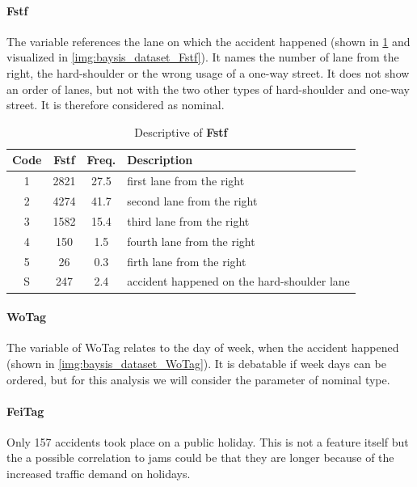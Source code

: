 \paragraph{Fstf}
\label{baysis_dataset_Fstf}
The variable references the lane on which the accident happened (shown in \cref{tbl:baysis_dataset_Fstf} and visualized in \cref{img:baysis_dataset_Fstf}). It names the number of lane from the right, the hard-shoulder or the wrong usage of a one-way street. It does not show an order of lanes, but not with the two other types of hard-shoulder and one-way street. It is therefore considered as nominal.
\begin{table}[ht]
	\centering
	\small
	\begin{tabular}{c|c|c|l}
		\toprule
		Code & \textbf{Fstf} & Freq. & Description \\ 
		\midrule  
		1 & 2821 	& 27.5 	& first lane from the right \\
		2 & 4274 	& 41.7 	& second lane from the right \\
		3 & 1582 	& 15.4 	& third lane from the right \\
		4 & 150 	& 1.5 	& fourth lane from the right \\
		5 & 26 		& 0.3 	& firth lane from the right \\ 
 		S & 247 	& 2.4 	& accident happened on the hard-shoulder lane \\ 
		\bottomrule
	\end{tabular}
	\caption{Descriptive of \textbf{Fstf}}
	\label{tbl:baysis_dataset_Fstf}
	\vspace{-8mm}
\end{table} 
\paragraph{WoTag}
\label{baysis_dataset_WoTag}
The variable of WoTag relates to the day of week, when the accident happened (shown in \cref{img:baysis_dataset_WoTag}). It is debatable if week days can be ordered, but for this analysis we will consider the parameter of nominal type.
\paragraph{FeiTag}
\label{baysis_dataset_FeiTag}
Only 157 accidents took place on a public holiday. This is not a feature itself but the a possible correlation to jams could be that they are longer because of the increased traffic demand on holidays.
	
